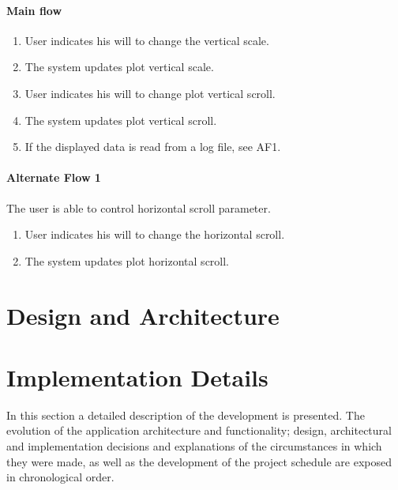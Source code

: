 			\paragraph{Main flow}
				\begin{enumerate}
				\item User indicates his will to change the vertical scale.
				\item The system updates plot vertical scale.
				\item User indicates his will to change plot vertical scroll.
				\item The system updates plot vertical scroll.
				\item If the displayed data is read from a log file, see AF1.
				\end{enumerate}
			
			\paragraph{Alternate Flow 1} The user is able to control horizontal scroll parameter.	
				\begin{enumerate}
				\item User indicates his will to change the horizontal scroll.
				\item The system updates plot horizontal scroll.
				\end{enumerate}

	\section{Design and Architecture}

	\section{Implementation Details}

		\begin{comment}
			Potential iterations
			It1. Bluetooth + Architecture prototype
			It2. USB + Log
			It3. Architecture rewriting
			It4. Adding it all and finishing

			For iteration description:
				+ objectives
				+ objectives description
					realization, done?
				+ Use Cases realized
				+ expected and spent time
				+ extra objectives
				+ prologue to next iteration

			Describe risk statuses updates in each iteration?
		\end{comment}

		In this section a detailed description of the development is presented. The evolution of the application architecture and functionality; design, architectural and implementation decisions and explanations of the circumstances in which they were made, as well as the development of the project schedule are exposed in chronological order.\\

